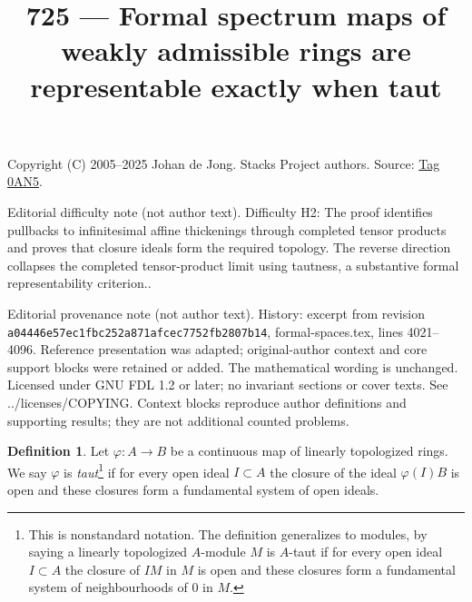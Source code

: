 \documentclass{amsart}
\theoremstyle{plain}
\theoremstyle{definition}
\newtheorem{definition}[subsection]{Definition}
\theoremstyle{remark}
\numberwithin{equation}{subsection}
\begin{document}
\title[Stacks Project, Tag 0AN5]{725 --- Formal spectrum maps of weakly admissible rings are representable exactly when taut}
\maketitle
\noindent Copyright (C) 2005--2025 Johan de Jong. Stacks Project authors. Source: \href{https://stacks.math.columbia.edu/tag/0AN5}{Tag 0AN5}.

\noindent Editorial difficulty note (not author text). Difficulty H2: The proof identifies pullbacks to infinitesimal affine thickenings through completed tensor products and proves that closure ideals form the required topology. The reverse direction collapses the completed tensor-product limit using tautness, a substantive formal representability criterion..

\noindent Editorial provenance note (not author text). History: excerpt from revision \texttt{a0444\allowbreak 6e57e\allowbreak c1fbc\allowbreak 252a8\allowbreak 71afc\allowbreak ec775\allowbreak 2fb28\allowbreak 07b14}, formal-spaces.tex, lines 4021--4096. Reference presentation was adapted; original-author context and core support blocks were retained or added. The mathematical wording is unchanged. Licensed under GNU FDL 1.2 or later; no invariant sections or cover texts. See ../licenses/COPYING. Context blocks reproduce author definitions and supporting results; they are not additional counted problems.

\begin{definition}
\label{definition-taut}
Let $\varphi : A \to B$ be a continuous map of linearly topologized rings.
We say $\varphi$ is {\it taut}\footnote{This is nonstandard notation.
The definition generalizes to modules, by saying a linearly topologized
$A$-module $M$ is $A$-taut if for every open ideal $I \subset A$ the closure
of $IM$ in $M$ is open and these closures form a fundamental system of
neighbourhoods of $0$ in $M$.}
if for every open ideal $I \subset A$ the closure of the ideal $\varphi(I)B$
is open and these closures form a fundamental system of open ideals.
\end{definition}
\end{document}
